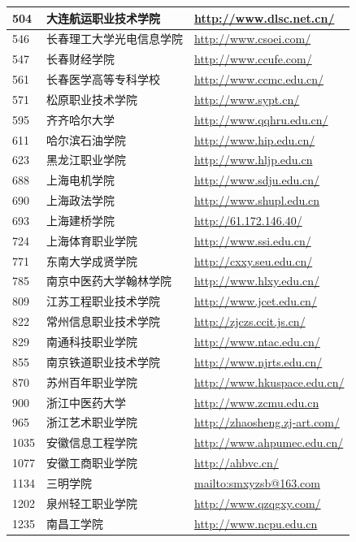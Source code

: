 \documentclass[logo,reportComp]{thesis}
\begin{document}
\begin{longtable}{|l|l|l|}
504 & 大连航运职业技术学院 & \url{http://www.dlsc.net.cn/}\\\hline
546 & 长春理工大学光电信息学院 & \url{http://www.csoei.com/}\\\hline
547 & 长春财经学院 & \url{http://www.ccufe.com/}\\\hline
561 & 长春医学高等专科学校 & \url{http://www.ccmc.edu.cn/}\\\hline
571 & 松原职业技术学院 & \url{http://www.sypt.cn/}\\\hline
595 & 齐齐哈尔大学 & \url{http://www.qqhru.edu.cn/}\\\hline
611 & 哈尔滨石油学院 & \url{http://www.hip.edu.cn/}\\\hline
623 & 黑龙江职业学院 & \url{http://www.hljp.edu.cn}\\\hline
688 & 上海电机学院 & \url{http://www.sdju.edu.cn/}\\\hline
690 & 上海政法学院 & \url{http://www.shupl.edu.cn}\\\hline
693 & 上海建桥学院 & \url{http://61.172.146.40/}\\\hline
724 & 上海体育职业学院 & \url{http://www.ssi.edu.cn/}\\\hline
771 & 东南大学成贤学院 & \url{http://cxxy.seu.edu.cn/}\\\hline
785 & 南京中医药大学翰林学院 & \url{http://www.hlxy.edu.cn/}\\\hline
809 & 江苏工程职业技术学院 & \url{http://www.jcet.edu.cn/}\\\hline
822 & 常州信息职业技术学院 & \url{http://zjczs.ccit.js.cn/}\\\hline
829 & 南通科技职业学院 & \url{http://www.ntac.edu.cn/}\\\hline
855 & 南京铁道职业技术学院 & \url{http://www.njrts.edu.cn/}\\\hline
870 & 苏州百年职业学院 & \url{http://www.hkuspace.edu.cn/}\\\hline
900 & 浙江中医药大学 & \url{http://www.zcmu.edu.cn}\\\hline
965 & 浙江艺术职业学院 & \url{http://zhaosheng.zj-art.com/}\\\hline
1035 & 安徽信息工程学院 & \url{http://www.ahpumec.edu.cn/}\\\hline
1077 & 安徽工商职业学院 & \url{http://ahbvc.cn/}\\\hline
1134 & 三明学院 & \url{mailto:smxyzsb@163.com}\\\hline
1202 & 泉州轻工职业学院 & \url{http://www.qzqgxy.com/}\\\hline
1235 & 南昌工学院 & \url{http://www.ncpu.edu.cn}\\\hline

\end{longtable}
\end{document}
